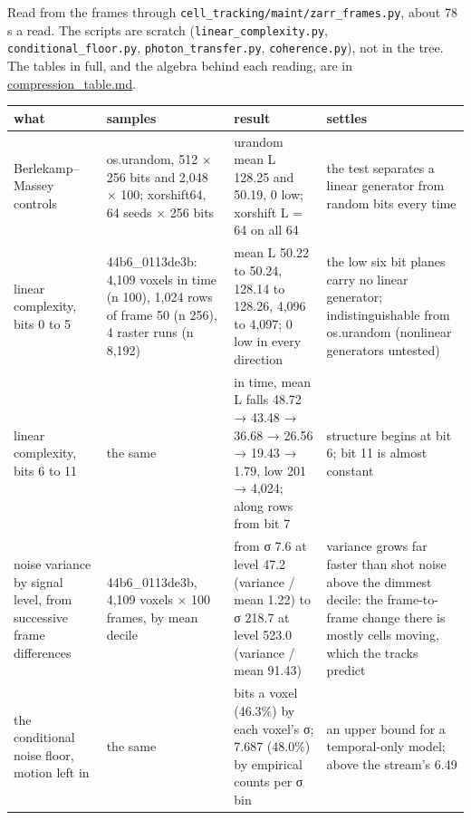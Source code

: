 Read from the frames through \texttt{cell\_\allowbreak{}tracking/\allowbreak{}maint/\allowbreak{}zarr\_\allowbreak{}frames.\allowbreak{}py}, about 78 s a read. The scripts are scratch (\texttt{linear\_\allowbreak{}complexity.\allowbreak{}py}, \texttt{conditional\_\allowbreak{}floor.\allowbreak{}py}, \texttt{photon\_\allowbreak{}transfer.\allowbreak{}py}, \texttt{coherence.\allowbreak{}py}), not in the tree. The tables in full, and the algebra behind each reading, are in \hyperref[chap:compression-table]{compression\_\allowbreak{}table.md}.

{\footnotesize
\setlength{\tabcolsep}{6pt}
\begin{longtable}{>{\RaggedRight\arraybackslash}p{}>{\RaggedRight\arraybackslash}p{}>{\RaggedRight\arraybackslash}p{}>{\RaggedRight\arraybackslash}p{}}
\toprule
what & samples & result & settles \\
\midrule
\endhead
Berlekamp–Massey controls & os.urandom, 512 × 256 bits and 2,048 × 100; xorshift64, 64 seeds × 256 bits & urandom mean L 128.25 and 50.19, 0 low; xorshift L = 64 on all 64 & the test separates a linear generator from random bits every time \\
linear complexity, bits 0 to 5 & 44b6\_\allowbreak{}0113de3b: 4,109 voxels in time (n 100), 1,024 rows of frame 50 (n 256), 4 raster runs (n 8,192) & mean L 50.22 to 50.24, 128.14 to 128.26, 4,096 to 4,097; 0 low in every direction & the low six bit planes carry no linear generator; indistinguishable from os.urandom (nonlinear generators untested) \\
linear complexity, bits 6 to 11 & the same & in time, mean L falls 48.72 → 43.48 → 36.68 → 26.56 → 19.43 → 1.79, low 201 → 4,024; along rows from bit 7 & structure begins at bit 6; bit 11 is almost constant \\
noise variance by signal level, from successive frame differences & 44b6\_\allowbreak{}0113de3b, 4,109 voxels × 100 frames, by mean decile & from σ 7.6 at level 47.2 (variance / mean 1.22) to σ 218.7 at level 523.0 (variance / mean 91.43) & variance grows far faster than shot noise above the dimmest decile: the frame-to-frame change there is mostly cells moving, which the tracks predict \\
the conditional noise floor, motion left in & the same & 7.403 bits a voxel (46.3\%) by each voxel's σ; 7.687 (48.0\%) by empirical counts per σ bin & an upper bound for a temporal-only model; above the stream's 6.49 \\

\end{longtable}}
